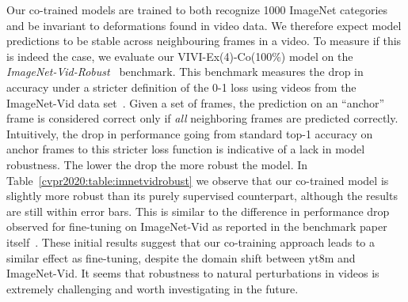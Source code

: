 \documentclass[10pt,twocolumn,letterpaper]{article}
\renewcommand{\paragraph}[1]{\noindent{\bf #1}\quad}
\begin{document}
{\paragraph{Robustness to video perturbations} Our co-trained models are trained to both recognize 1000 ImageNet categories and be invariant to deformations found in video data. We therefore expect model predictions to be stable across neighbouring frames in a video.
To measure if this is indeed the case, we evaluate our VIVI-Ex(4)-Co(100\%) model on the \emph{ImageNet-Vid-Robust}~\cite{shankar2019systematic} benchmark.
This benchmark measures the drop in accuracy under a stricter definition of the 0-1 loss using videos from the ImageNet-Vid data set~\cite{imagenet}. Given a set of frames, the prediction on an ``anchor'' frame is considered correct only if \emph{all} neighboring frames are predicted correctly. Intuitively, the drop in performance going from standard top-1 accuracy on anchor frames to this stricter loss function is indicative of a lack in model robustness. The lower the drop the more robust the model. In Table~\ref{cvpr2020:table:imnetvidrobust} we observe that our co-trained model is slightly more robust than its purely supervised counterpart, although the results are still within error bars. This is similar to the difference in performance drop observed for fine-tuning on ImageNet-Vid as reported in the benchmark paper itself~\cite[Table 1]{shankar2019systematic}. These initial results suggest that our co-training approach leads to a similar effect as fine-tuning, despite the domain shift between \gls{yt8m} and ImageNet-Vid.
It seems that robustness to natural perturbations in videos is extremely challenging and worth investigating in the future.



}
\end{document}

